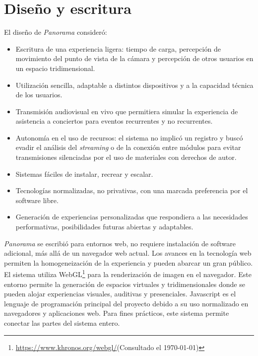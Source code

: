 
\section*{Diseño y escritura} %

El diseño de \textit{Panorama} consideró:

\begin{itemize}
\item Escritura de una experiencia ligera: tiempo de carga, percepción de movimiento del punto de vista de la cámara y percepción de otros usuarios en un espacio tridimensional.  
\item Utilización sencilla, adaptable a distintos dispositivos y a la capacidad técnica de los usuarios.
\item Transmisión audiovisual en vivo que permitiera simular la experiencia de asistencia a conciertos para eventos recurrentes y no recurrentes. 
\item Autonomía en el uso de recursos: el sistema no implicó un registro y buscó evadir el análisis del \textit{streaming} o de la conexión entre módulos para evitar transmisiones silenciadas por el uso de materiales con derechos de autor. 
\item Sistemas fáciles de instalar, recrear y escalar.
\item Tecnologías normalizadas, no privativas, con una marcada preferencia por el software libre.
\item Generación de experiencias personalizadas que respondiera a las necesidades performativas, posibilidades futuras abiertas y adaptables. 
\end{itemize}

\textit{Panorama} se escribió para entornos web, no requiere instalación de software adicional, más allá de un navegador web actual. Los avances en la tecnología web permiten la homogeneización de la experiencia y pueden abarcar un gran público. El sistema utiliza WebGL\footnote{\url{https://www.khronos.org/webgl/}(Consultado el \today)} para la renderización de imagen en el navegador. Este entorno permite la generación de espacios virtuales y tridimensionales donde se pueden alojar experiencias visuales, auditivas y presenciales. Javascript es el lenguaje de programación principal del proyecto debido a su uso normalizado en navegadores y aplicaciones web. Para fines prácticos, este sistema permite conectar las partes del sistema entero.

